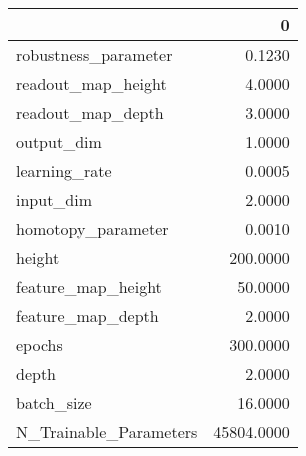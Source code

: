 \begin{tabular}{lr}
\toprule
{} &           0 \\
\midrule
robustness\_parameter   &      0.1230 \\
readout\_map\_height     &      4.0000 \\
readout\_map\_depth      &      3.0000 \\
output\_dim             &      1.0000 \\
learning\_rate          &      0.0005 \\
input\_dim              &      2.0000 \\
homotopy\_parameter     &      0.0010 \\
height                 &    200.0000 \\
feature\_map\_height     &     50.0000 \\
feature\_map\_depth      &      2.0000 \\
epochs                 &    300.0000 \\
depth                  &      2.0000 \\
batch\_size             &     16.0000 \\
N\_Trainable\_Parameters &  45804.0000 \\
\bottomrule
\end{tabular}
